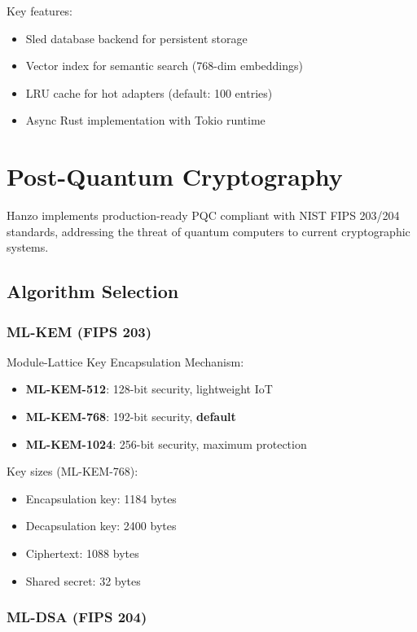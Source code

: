 \documentclass[11pt,twocolumn]{article}
\begin{document}
Key features:
\begin{itemize}
\item Sled database backend for persistent storage
\item Vector index for semantic search (768-dim embeddings)
\item LRU cache for hot adapters (default: 100 entries)
\item Async Rust implementation with Tokio runtime
\end{itemize}

\section{Post-Quantum Cryptography}

Hanzo implements production-ready PQC compliant with NIST FIPS 203/204 standards, addressing the threat of quantum computers to current cryptographic systems.

\subsection{Algorithm Selection}

\subsubsection{ML-KEM (FIPS 203)}

Module-Lattice Key Encapsulation Mechanism:

\begin{itemize}
\item \textbf{ML-KEM-512}: 128-bit security, lightweight IoT
\item \textbf{ML-KEM-768}: 192-bit security, \textbf{default}
\item \textbf{ML-KEM-1024}: 256-bit security, maximum protection
\end{itemize}

Key sizes (ML-KEM-768):
\begin{itemize}
\item Encapsulation key: 1184 bytes
\item Decapsulation key: 2400 bytes
\item Ciphertext: 1088 bytes
\item Shared secret: 32 bytes
\end{itemize}

\subsubsection{ML-DSA (FIPS 204)}
\end{document}
